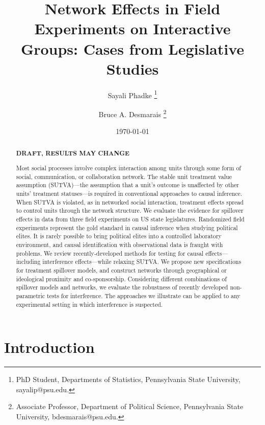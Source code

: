 \documentclass[12pt]{article}
\title{\vspace{-2cm} Network Effects in Field Experiments on Interactive Groups: Cases from Legislative Studies }
\author{Sayali Phadke \thanks{\footnotesize{PhD Student, Departments of Statistics, Pennsylvania State University, sayalip@psu.edu.}} \and Bruce A. Desmarais \thanks{\footnotesize{Associate Professor, Department of Political Science, Pennsylvania State University, bdesmarais@psu.edu.}}} \date{\today}
\begin{document}
\maketitle




\begin{abstract} 
\vspace{.3cm}
\begin{center}
{\bf DRAFT, RESULTS MAY CHANGE}
\end{center}
\vspace{.3cm}

\noindent  Most social processes involve complex interaction among units through some form of social, communication, or collaboration network. The stable unit treatment value assumption (SUTVA)---the assumption that a unit's outcome is unaffected by other units' treatment statuses---is required in conventional approaches to causal inference. When SUTVA is violated, as in networked social interaction, treatment effects spread to control units through the network structure. We evaluate the evidence for spillover effects in data from three field experiments on US state legislatures. Randomized field experiments represent the gold standard in causal inference when studying political elites. It is rarely possible to bring political elites into a controlled laboratory environment, and causal identification with observational data is fraught with problems. We review recently-developed methods for testing for causal effects---including interference effects---while relaxing SUTVA. We propose new specifications for treatment spillover models, and construct networks through geographical or ideological proximity and co-sponsorship. Considering different combinations of spillover models and networks, we evaluate the robustness of recently developed non-parametric tests for interference. The approaches we illustrate can be applied to any experimental setting in which interference is suspected. 

\end{abstract}

\thispagestyle{empty}
\doublespacing

\section{Introduction}
\end{document}
